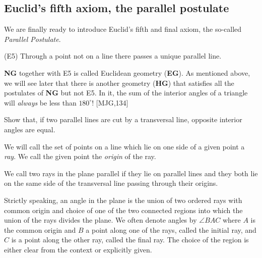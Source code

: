


\subsection*{Euclid's fifth axiom, the parallel postulate}

We are finally ready to introduce Euclid's fifth and final axiom, the
so-called \textit{Parallel Postulate}.

\begin{axiom}
(E5) Through a point not on a line there passes a unique parallel line.
\end{axiom}

\textbf{NG} together with E5 is called Euclidean geometry (\textbf{EG}). As
mentioned above, we will see later that there is another geometry
(\textbf{HG}) that satisfies all the postulates of \textbf{NG} but not E5. In
it, the sum of the interior angles of a triangle will \textit{always} be less
than $180^\circ$! [MJG,134]

\begin{question}
\label{24} Show that, if two parallel lines are cut by a
transversal line, opposite interior angles are equal.
\end{question}

We will call the set of points on a line which lie on one side of a given
point a \textit{ray}. We call the given point the \textit{origin} of the ray.

We call two rays in the plane parallel if they lie on parallel lines and they
both lie on the same side of the transversal line passing through their origins.

Strictly speaking, an angle in the plane is the union of two ordered rays with
common origin and choice of one of the two connected regions into which the
union of the rays divides the plane. We often denote angles by $\angle BAC$
where $A$ is the common origin and $B$ a point along one of the rays, called
the initial ray, and $C$ is a point along the other ray, called the final ray.
The choice of the region is either clear from the context or explicitly given.

